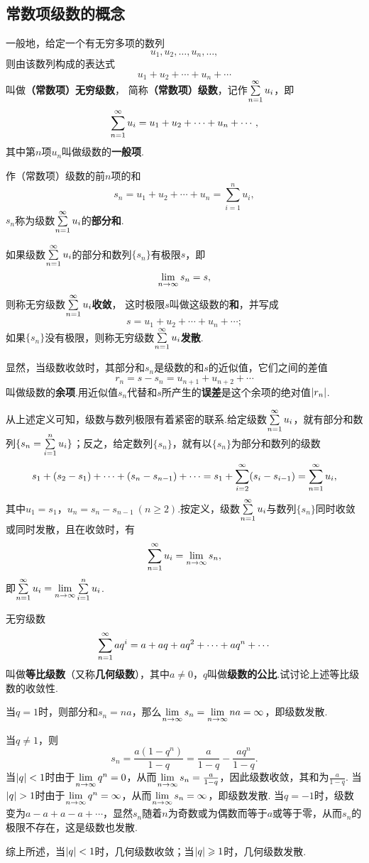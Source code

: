 \subsection{常数项级数的概念}
\begin{definition}
一般地，给定一个有无穷多项的数列\[
u_1,u_2,\dotsc,u_n,\dotsc,
\]则由该数列构成的表达式\[
u_1+u_2+\dotsb+u_n+\dotsb
\]叫做\textbf{（常数项）无穷级数}，%
简称\textbf{（常数项）级数}，记作\(\sum\limits_{n=1}^{\infty} u_i\)，即\[
\sum\limits_{n=1}^{\infty} u_i
=u_1+u_2+\dotsb+u_n+\dotsb,
\]其中第\(n\)项\(u_n\)叫做级数的\textbf{一般项}.

作（常数项）级数的前\(n\)项的和\[
s_n = u_1+u_2+\dotsb+u_n = \sum\limits_{i=1}^n{u_i},
\]\(s_n\)称为级数\(\sum\limits_{n=1}^{\infty} u_i\)的\textbf{部分和}.

如果级数\(\sum\limits_{n=1}^{\infty} u_i\)的部分和数列\(\{s_n\}\)有极限\(s\)，即\[
\lim\limits_{n\to\infty} s_n = s,
\]则称无穷级数\(\sum\limits_{n=1}^{\infty} u_i\)\textbf{收敛}，%
这时极限\(s\)叫做这级数的\textbf{和}，并写成\[
s = u_1+u_2+\dotsb+u_n+\dotsb;
\]如果\(\{s_n\}\)没有极限，则称无穷级数\(\sum\limits_{n=1}^{\infty} u_i\)\textbf{发散}.

显然，当级数收敛时，其部分和\(s_n\)是级数的和\(s\)的近似值，它们之间的差值\[
r_n = s - s_n = u_{n+1}+u_{n+2}+\dotsb
\]叫做级数的\textbf{余项}.用近似值\(s_n\)代替和\(s\)所产生的\textbf{误差}是这个余项的绝对值\(\abs{r_n}\).
\end{definition}
从上述定义可知，级数与数列极限有着紧密的联系.给定级数\(\sum\limits_{n=1}^{\infty} u_i\)，就有部分和数列\(\{s_n = \sum\limits_{i=1}^n u_i\}\)；反之，给定数列\(\{s_n\}\)，就有以\(\{s_n\}\)为部分和数列的级数\[
s_1 + (s_2-s_1) + \dotsb + (s_n-s_{n-1}) + \dotsb
= s_1 + \sum\limits_{i=2}^{\infty}(s_i-s_{i-1})
= \sum\limits_{n=1}^{\infty} u_i,
\]其中\(u_1=s_1\)，\(u_n=s_n-s_{n-1}\ (n \geqslant 2)\).按定义，级数\(\sum\limits_{n=1}^{\infty} u_i\)与数列\(\{s_n\}\)同时收敛或同时发散，且在收敛时，有\[
\sum\limits_{n=1}^{\infty} u_i = \lim\limits_{n\to\infty} s_n,
\]即\(\sum\limits_{n=1}^{\infty} u_i = \lim\limits_{n\to\infty} \sum\limits_{i=1}^n u_i\).

\begin{example}\label{example:无穷级数.等比级数的收敛性}
无穷级数\[
\sum\limits_{n=1}^{\infty} a q^i = a+aq+aq^2+\dotsb+aq^n+\dotsb
\]叫做\textbf{等比级数}（又称\textbf{几何级数}），其中\(a \neq 0\)，\(q\)叫做\textbf{级数的公比}.试讨论上述等比级数的收敛性.
\begin{solution}
当\(q = 1\)时，则部分和\(s_n=na\)，那么\(\lim\limits_{n\to\infty} s_n = \lim\limits_{n\to\infty} na = \infty\)，即级数发散.

当\(q \neq 1\)，则\[
s_n = \frac{a(1-q^n)}{1-q} = \frac{a}{1-q} - \frac{aq^n}{1-q}.
\]
当\(\abs{q} < 1\)时由于\(\lim\limits_{n\to\infty} q^n=0\)，从而\(\lim\limits_{n\to\infty} s_n=\frac{a}{1-q}\)，因此级数收敛，其和为\(\frac{a}{1-q}\).
当\(\abs{q} > 1\)时由于\(\lim\limits_{n\to\infty} q^n=\infty\)，从而\(\lim\limits_{n\to\infty} s_n=\infty\)，即级数发散.
当\(q = -1\)时，级数变为\(a-a+a-a+\dotsb\)，显然\(s_n\)随着\(n\)为奇数或为偶数而等于\(a\)或等于零，从而\(s_n\)的极限不存在，这是级数也发散.

综上所述，{\color{red}当\(\abs{q} < 1\)时，几何级数收敛；当\(\abs{q} \geqslant 1\)时，几何级数发散.}
\end{solution}
\end{example}


